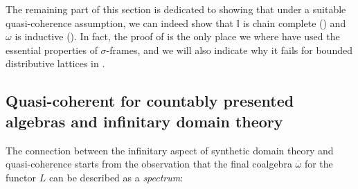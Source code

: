 \documentclass[a4paper,12pt]{amsart}
\theoremstyle{definition}
\newcommand{\mbb}[1]{\mathbb{#1}}
\newcommand{\I}{\mbb I}
\newcommand{\ov}[1]{\overline{#1}}
\begin{document}
The remaining part of this section is dedicated to showing that under a suitable quasi-coherence assumption, we can indeed show that $\I$ is chain complete () and $\omega$ is inductive (). In fact, the proof of  is the only place we where have used the essential properties of $\sigma$-frames, and we will also indicate why it fails for bounded distributive lattices in .


\subsection{Quasi-coherent for countably presented algebras and infinitary domain theory}
The connection between the infinitary aspect of synthetic domain theory and quasi-coherence starts from the observation that the final coalgebra $\ov\omega$ for the functor $L$ can be described as a \emph{spectrum}:
\end{document}
